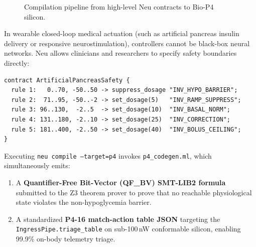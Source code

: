\documentclass[11pt]{article}
\begin{document}
\begin{figure}[h]
\centering
{}
\caption{Compilation pipeline from high-level Neu contracts to Bio-P4 silicon.}
\label{fig:biop4_pipeline}
\end{figure}

In wearable closed-loop medical actuation (such as artificial pancreas insulin delivery or responsive neurostimulation), controllers cannot be black-box neural networks. Neu allows clinicians and researchers to specify safety boundaries directly:
\begin{lstlisting}[language=neu]
contract ArtificialPancreasSafety {
  rule 1:   0..70, -50..50 -> suppress_dosage "INV_HYPO_BARRIER";
  rule 2:  71..95, -50..-2 -> set_dosage(5)   "INV_RAMP_SUPPRESS";
  rule 3: 96..130,  -2..5  -> set_dosage(10)  "INV_BASAL_NORM";
  rule 4: 131..180, -2..10 -> set_dosage(25)  "INV_CORRECTION";
  rule 5: 181..400, -2..50 -> set_dosage(40)  "INV_BOLUS_CEILING";
}
\end{lstlisting}

Executing \texttt{neu compile --target=p4} invokes \texttt{p4\_codegen.ml}, which simultaneously emits:
\begin{enumerate}
    \item A \textbf{Quantifier-Free Bit-Vector (QF\_BV) SMT-LIB2 formula} submitted to the Z3 theorem prover to prove that no reachable physiological state violates the non-hypoglycemia barrier.
    \item A standardized \textbf{P4-16 match-action table JSON} targeting the \texttt{IngressPipe.triage\_table} on sub-100\,nW conformable silicon, enabling 99.9\% on-body telemetry triage.
\end{enumerate}
\end{document}
